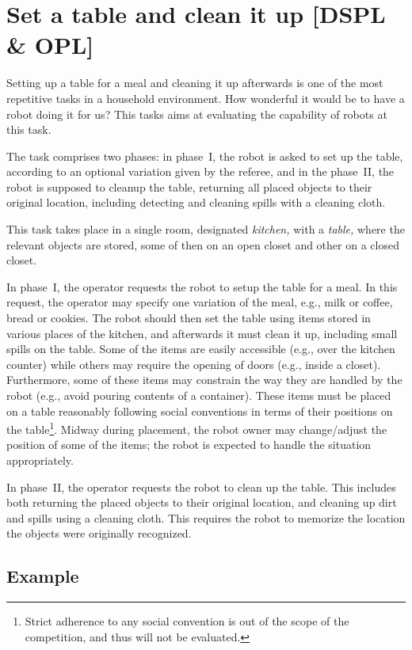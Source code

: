 \section{Set a table and clean it up [DSPL \& OPL]}

Setting up a table for a meal and cleaning it up afterwards is one of the most repetitive tasks in a household environment. How wonderful it would be to have a robot doing it for us? This tasks aims at evaluating the capability of robots at this task.

The task comprises two phases: in phase~I, the robot is asked to set up the table, according to an optional variation given by the referee, and in the phase~II, the robot is supposed to cleanup the table, returning all placed objects to their original location, including detecting and cleaning spills with a cleaning cloth.

This task takes place in a single room, designated \emph{kitchen,} with a \emph{table,} where the relevant objects are stored, some of then on an open closet and other on a closed closet.

In phase~I, the operator requests the robot to setup the table for a meal. In this request, the operator may specify one variation of the meal, e.g., milk or coffee, bread or cookies. The robot should then set the table using items stored in various places of the kitchen, and afterwards it must clean it up, including small spills on the table. Some of the items are easily accessible (e.g., over the kitchen counter) while others may require the opening of doors (e.g., inside a closet). Furthermore, some of these items may constrain the way they are handled by the robot (e.g., avoid pouring contents of a container). These items must be placed on a table reasonably following social conventions in terms of their positions on the table\footnote{Strict adherence to any social convention is out of the scope of the competition, and thus will not be evaluated.}. Midway during placement, the robot owner may change/adjust the position of some of the items; the robot is expected to handle the situation appropriately.

In phase~II, the operator requests the robot to clean up the table. This includes both returning the placed objects to their original location, and cleaning up dirt and spills using a cleaning cloth. This requires the robot to memorize the location the objects were originally recognized.


\subsection{Example}

